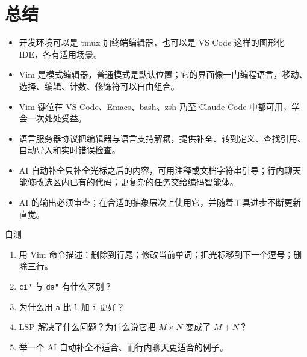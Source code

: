 \documentclass[a4paper]{article}
\begin{document}
\section{总结}

\begin{itemize}
\item 开发环境可以是 tmux 加终端编辑器，也可以是 VS Code 这样的图形化 IDE，各有适用场景。
\item Vim 是模式编辑器，普通模式是默认位置；它的界面像一门编程语言，移动、选择、编辑、计数、修饰符可以自由组合。
\item Vim 键位在 VS Code、Emacs、bash、zsh 乃至 Claude Code 中都可用，学会一次处处受益。
\item 语言服务器协议把编辑器与语言支持解耦，提供补全、转到定义、查找引用、自动导入和实时错误检查。
\item AI 自动补全只补全光标之后的内容，可用注释或文档字符串引导；行内聊天能修改选区内已有的代码；更复杂的任务交给编码智能体。
\item AI 的输出必须审查；在合适的抽象层次上使用它，并随着工具进步不断更新直觉。
\end{itemize}

\begin{practicebox}{自测}
\begin{enumerate}
\item 用 Vim 命令描述：删除到行尾；修改当前单词；把光标移到下一个逗号；删除三行。
\item \texttt{ci"} 与 \texttt{da"} 有什么区别？
\item 为什么用 \texttt{a} 比 \texttt{l} 加 \texttt{i} 更好？
\item LSP 解决了什么问题？为什么说它把 $M \times N$ 变成了 $M + N$？
\item 举一个 AI 自动补全不适合、而行内聊天更适合的例子。
\end{enumerate}
\end{practicebox}
\end{document}

